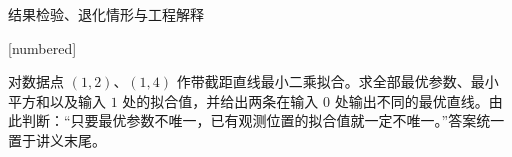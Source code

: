 \documentclass[aspectratio=169,10pt,fontset=fandol]{ctexbeamer}
\makeatletter
\newcommand{\mathagentexerciselabelcontext}[1]{%
\hypertarget<1>{#1}{}%
\edef\@currentHref{#1}%
}
\makeatother
\begin{document}
\begin{frame}[t,fragile]{结果检验、退化情形与工程解释}
\normalsize
{\normalsize
[numbered]
\mathagentexerciselabelcontext{mathagent.exercise.U0051.0}
\begin{exercise}
\label{mathagent:exercise:2a86525c0362bd6004ffb20b570bb82a80598d07bb305d4bd130c7cd7cc87533}
对数据点 $(1,2)$、$(1,4)$ 作带截距直线最小二乘拟合。求全部最优参数、最小平方和以及输入 $1$ 处的拟合值，并给出两条在输入 $0$ 处输出不同的最优直线。由此判断：“只要最优参数不唯一，已有观测位置的拟合值就一定不唯一。”答案统一置于讲义末尾。
\end{exercise}
}
\end{frame}
\end{document}
